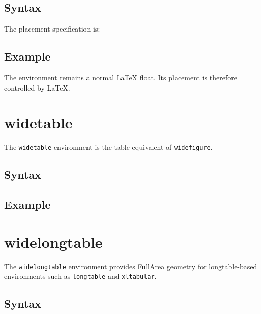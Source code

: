 \documentclass[
11pt,
a4paper,
oneside
]{scrbook}
\begin{document}
\subsection{Syntax}
	




	
The  placement specification is:
	




	
\subsection{Example}
	




The environment remains a normal LaTeX float.
Its placement is therefore controlled by LaTeX.
	
\section{widetable}
The \texttt{widetable} environment is the table equivalent of
	\texttt{widefigure}.
	
\subsection{Syntax}
	




	
\subsection{Example}
	




	
\section{widelongtable}
	
The \texttt{widelongtable} environment provides FullArea geometry for
longtable-based environments such as \texttt{longtable} and
\texttt{xltabular}.
	
\subsection{Syntax}
	
\end{document}

